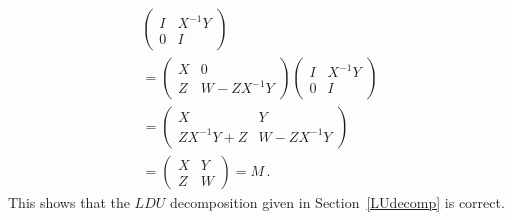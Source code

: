 {\begin{gather*}
\left(\begin{array}{c|c}I&X^{-1}Y\\\hline 0&I\end{array}\right)\\=
\left(\begin{array}{c|c}X&0\\\hline Z&W-ZX^{-1}Y\end{array}\right)
\left(\begin{array}{c|c}I&X^{-1}Y\\\hline 0&I\end{array}\right)
\\=
\left(\begin{array}{c|c}X&Y\\\hline ZX^{-1}Y+Z&W-ZX^{-1}Y\end{array}\right)
\\
=\left(\begin{array}{c|c}X&Y\\\hline Z&W\end{array}\right)=M\, .
\end{gather*}
This shows that the $LDU$ decomposition given in Section~\ref{LUdecomp} is correct.
} %

